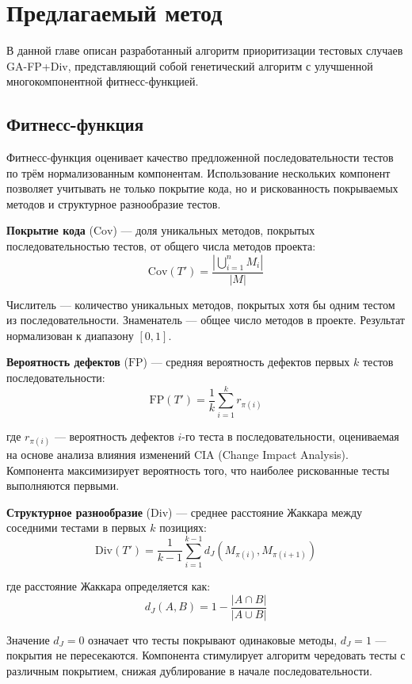 \chapter{Предлагаемый метод} \label{ch3}

В данной главе описан разработанный алгоритм приоритизации тестовых случаев GA-FP+Div, представляющий 
собой генетический алгоритм с улучшенной многокомпонентной фитнесс-функцией.

\section{Фитнесс-функция}\label{ch3:sec1}

Фитнесс-функция оценивает качество предложенной последовательности тестов по трём нормализованным компонентам. 
Использование нескольких компонент позволяет учитывать не только покрытие кода, но и рискованность покрываемых 
методов и структурное разнообразие тестов.

\textbf{Покрытие кода} ($\text{Cov}$) --- доля уникальных методов, покрытых последовательностью тестов, от 
общего числа методов проекта:
$$\text{Cov}(T') = \frac{|\bigcup_{i=1}^{n} M_i|}{|M|}$$

Числитель --- количество уникальных методов, покрытых хотя бы одним тестом из последовательности. 
Знаменатель --- общее число методов в проекте. Результат нормализован к диапазону $[0, 1]$.

\textbf{Вероятность дефектов} ($\text{FP}$) --- средняя вероятность дефектов первых $k$ тестов последовательности:
$$\text{FP}(T') = \frac{1}{k}\sum_{i=1}^{k} r_{\pi(i)}$$

где $r_{\pi(i)}$ --- вероятность дефектов $i$-го теста в последовательности, оцениваемая на основе анализа 
влияния изменений CIA (Change Impact Analysis). Компонента максимизирует вероятность того, что наиболее 
рискованные тесты выполняются первыми.

\textbf{Структурное разнообразие} ($\text{Div}$) --- среднее расстояние Жаккара между соседними тестами в 
первых $k$ позициях:
$$\text{Div}(T') = \frac{1}{k-1}\sum_{i=1}^{k-1} d_J(M_{\pi(i)}, M_{\pi(i+1)})$$

где расстояние Жаккара определяется как:
$$d_J(A, B) = 1 - \frac{|A \cap B|}{|A \cup B|}$$

Значение $d_J = 0$ означает что тесты покрывают одинаковые методы, $d_J = 1$ --- покрытия не пересекаются. 
Компонента стимулирует алгоритм чередовать тесты с различным покрытием, снижая дублирование в начале последовательности.

